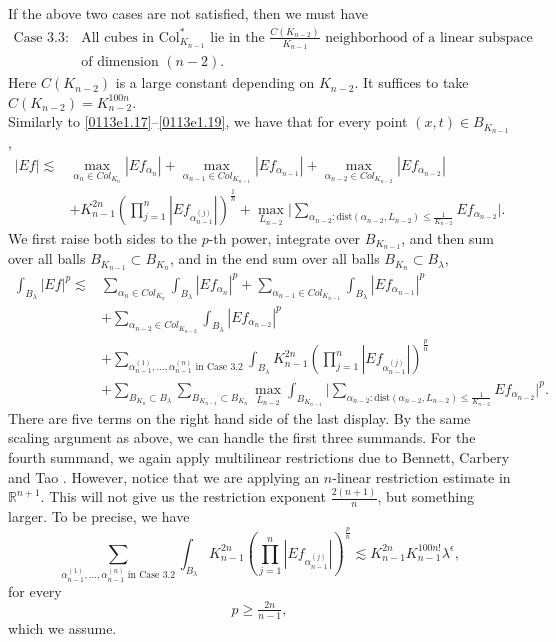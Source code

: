 \documentclass[12pt,leqno]{amsart}
\def\R{\mathbb{R}}
\def\lesim{\lesssim}
\theoremstyle{plain}
\numberwithin{equation}{section}
\begin{document}
If the above two cases are not satisfied, then we must have 
\[
\begin{split}
\text{Case 3.3: } & \text{All cubes in $\mathrm{Col}^*_{K_{n-1}}$ lie in the $\tfrac{C(K_{n-2})}{K_{n-1}}$ neighborhood of a linear subspace}\\
&\text{of dimension $(n-2)$.}
\end{split}
\]
Here $C(K_{n-2})$ is a large constant depending on $K_{n-2}$. It suffices to take $C(K_{n-2})=K_{n-2}^{100n}$.\\

Similarly to \eqref{0113e1.17}--\eqref{0113e1.19}, we have that for every point $(x, t)\in B_{K_{n-1}}$,
\[
\begin{split}
|Ef|\lesim & \max_{\alpha_n\in Col_{K_n}} |Ef_{\alpha_n}|+\max_{\alpha_{n-1}\in Col_{K_{n-1}}} |Ef_{\alpha_{n-1}}| +\max_{\alpha_{n-2}\in Col_{K_{n-2}}} |Ef_{\alpha_{n-2}}|\\
& + K_{n-1}^{2n} \left( \prod_{j=1}^{n} |Ef_{\alpha_{n-1}^{(j)}}|\right)^{\frac{1}{n}} + \max_{L_{n-2}} \Big|\sum_{\alpha_{n-2}: \text{dist}(\alpha_{n-2}, L_{n-2})\le \frac{1}{K_{n-2}}}Ef_{\alpha_{n-2}}\Big|.
\end{split}
\]
We first raise both sides to the $p$-th power, integrate over $B_{K_{n-1}}$, 
and then sum over all balls $B_{K_{n-1}}\subset B_{K_n}$, and in the end sum over all balls $B_{K_n}\subset B_{\lambda}$, 
\[
\begin{split}
\int_{B_{\lambda}}|Ef|^p\lesim & \sum_{\alpha_n\in Col_{K_n}} \int_{B_{\lambda}}|Ef_{\alpha_n}|^p+\sum_{\alpha_{n-1}\in Col_{K_{n-1}}} \int_{B_{\lambda}}|Ef_{\alpha_{n-1}}|^p\\
& +\sum_{\alpha_{n-2}\in Col_{K_{n-2}}} \int_{B_{\lambda}}|Ef_{\alpha_{n-2}}|^p\\
& + \sum_{\alpha_{n-1}^{(1)}, \dots, \alpha_{n-1}^{(n)} \text{ in Case 3.2} }\int_{B_{\lambda}} K_{n-1}^{2n} \left( \prod_{j=1}^{n} |Ef_{\alpha_{n-1}^{(j)}}|\right)^{\frac{p}{n}}\\
& + \sum_{B_{K_n}\subset B_{\lambda}}  \sum_{B_{K_{n-1}}\subset B_{K_n}}\max_{L_{n-2}} \int_{B_{K_{n-1}}}\Big|\sum_{\alpha_{n-2}: \text{dist}(\alpha_{n-2}, L_{n-2})\le \frac{1}{K_{n-2}}}Ef_{\alpha_{n-2}}\Big|^p.
\end{split}
\]
There are five terms on the right hand side of the last display. By the same scaling argument as above, we can handle the first three summands. For the fourth summand, we again apply multilinear restrictions due to Bennett, Carbery and Tao \cite{BCT06}. However, notice that we are applying an $n$-linear restriction estimate in $\R^{n+1}$. This will not give us the restriction exponent $\frac{2(n+1)}{n}$, but something larger. To be precise, we have 
\[
\sum_{\alpha_{n-1}^{(1)}, \dots, \alpha_{n-1}^{(n)} \text{ in Case 3.2} }\int_{B_{\lambda}} K_{n-1}^{2n} \left( \prod_{j=1}^{n} |Ef_{\alpha_{n-1}^{(j)}}|\right)^{\frac{p}{n}} \lesim K_{n-1}^{2n} K_{n-1}^{100 n!} \lambda^{\epsilon},
\]
for every 
\[
p\ge \tfrac{2n}{n-1},
\]
which we assume. \\
\end{document}
